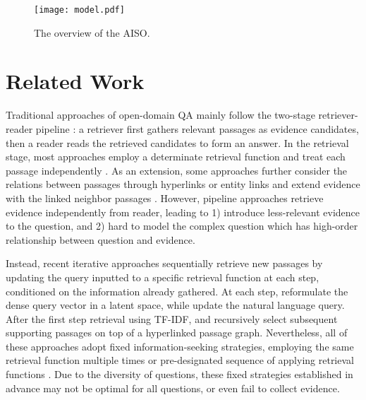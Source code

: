 \documentclass[11pt]{article}
\begin{document}
\begin{figure*}
    \centering
    \texttt{[image: model.pdf]}
    \caption{The overview of the AISO.}
    \label{fig:model}
\end{figure*}


\section{Related Work}
Traditional approaches of open-domain QA mainly follow the two-stage retriever-reader pipeline \citep{chen-etal-2017-reading}: a retriever first gathers relevant passages as evidence candidates, then a reader reads the retrieved candidates to form an answer.
In the retrieval stage, most approaches employ a determinate retrieval function and treat each passage independently \citep{wang2018r, lin-etal-2018-denoising, lee-etal-2018-ranking, yang-etal-2018-hotpotqa, pang2019has, lee-etal-2019-latent, pmlr-v119-guu20a, karpukhin-etal-2020-dense, izacard2020leveraging}.
As an extension, some approaches further consider the relations between passages through hyperlinks or entity links and extend evidence with the linked neighbor passages \citep{nie-etal-2019-revealing, das-etal-2019-multi, Zhao2020Transformer-XH}.
However, pipeline approaches retrieve evidence independently from reader, leading to 1) introduce less-relevant evidence to the question, and 2) hard to model the complex question which has high-order relationship between question and evidence.

Instead, recent iterative approaches sequentially retrieve new passages by updating the query inputted to a specific retrieval function at each step, conditioned on the information already gathered.
At each step, \citet{das2018multistep, feldman-el-yaniv-2019-multi, xiong2021answering} reformulate the dense query vector in a latent space, while \citet{ding-etal-2019-cognitive, qi-etal-2019-answering, zhang2020ddrqa, qi2020retrieve} update the natural language query.
After the first step retrieval using TF-IDF, \citet{Asai2020Learning} and \citet{li2020hopretriever} recursively select subsequent supporting passages on top of a hyperlinked passage graph.
Nevertheless, all of these approaches adopt fixed information-seeking strategies, employing the same retrieval function multiple times \citep{das2018multistep, feldman-el-yaniv-2019-multi, xiong2021answering, ding-etal-2019-cognitive, qi-etal-2019-answering, zhang2020ddrqa, qi2020retrieve} or pre-designated sequence of applying retrieval functions \citep{Asai2020Learning, li2020hopretriever}.
Due to the diversity of questions, these fixed strategies established in advance may not be optimal for all questions, or even fail to collect evidence.
\end{document}
